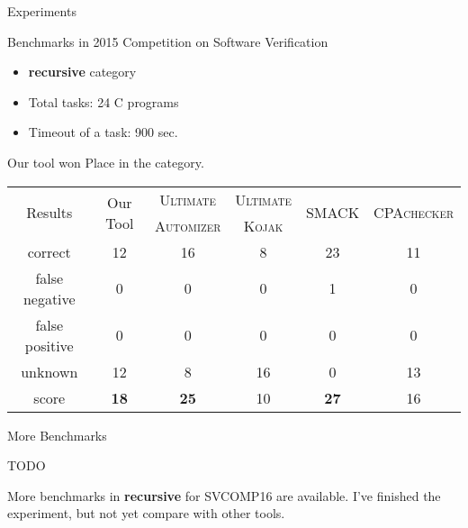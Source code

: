 \begin{frame}{Experiments}

  Benchmarks in 2015 Competition on Software Verification
  \begin{itemize}
    \item \textbf{recursive} category
    \item Total tasks: 24 C programs
    \item Timeout of a task: 900 sec.
  \end{itemize}
  Our tool won  Place in the category.

\begin{table}
\resizebox{\textwidth}{!}
{
\begin{tabular}{|c|cc|c|c|c|c|}
\hline
\multirow{2}{*}{Results} & \multicolumn{2}{c|}{\multirow{2}{*}{Our Tool}} & \textsc{Ultimate} & \textsc{Ultimate} & \multirow{2}{*}{\textsc{SMACK}} & \multirow{2}{*}{\textsc{CPAchecker}} \\ 
& & & \textsc{Automizer} & \textsc{Kojak} & & \\
\hline\hline
correct          & \multicolumn{2}{c|}{12}   & 16  & 8  & 23 & 11 \\ 
false negative   & \multicolumn{2}{c|}{0}    & 0   & 0  & 1  & 0 \\
false positive   & \multicolumn{2}{c|}{0}    & 0   & 0  & 0  & 0 \\
unknown          & \multicolumn{2}{c|}{12}   & 8   & 16 & 0  & 13 \\
\hline\hline
score            & \multicolumn{2}{c|}{\textbf{18}}   & \textbf{25}   & 10  & \textbf{27} & 16 \\
\hline
\end{tabular}
}
\end{table}

\end{frame}

\begin{frame}{More Benchmarks}

\alert{TODO}

More benchmarks in \textbf{recursive} for SVCOMP16 are available.
I've finished the experiment, but not yet compare with other tools.

\end{frame}
